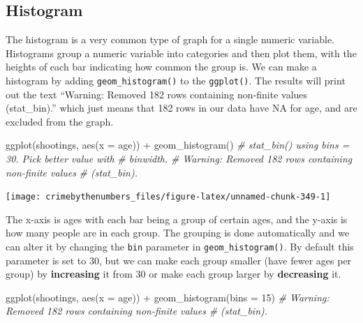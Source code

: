 \documentclass[
]{krantz}
\makeatletter
\newenvironment{Shaded}{\begin{snugshade}}{\end{snugshade}}
\newcommand{\AttributeTok}[1]{\textcolor[rgb]{0.61,0.61,0.61}{#1}}
\newcommand{\CommentTok}[1]{\textcolor[rgb]{0.37,0.37,0.37}{\textit{#1}}}
\newcommand{\DecValTok}[1]{\textcolor[rgb]{0.06,0.06,0.06}{#1}}
\newcommand{\FunctionTok}[1]{\textcolor[rgb]{0,0,0}{#1}}
\newcommand{\NormalTok}[1]{#1}
\newcommand{\SpecialCharTok}[1]{\textcolor[rgb]{0,0,0}{#1}}
\newenvironment{kframe}{%
\medskip{}
\setlength{\fboxsep}{.8em}
 \def\at@end@of@kframe{}%
 \ifinner\ifhmode%
  \def\at@end@of@kframe{\end{minipage}}%
  \begin{minipage}{\columnwidth}%
 \fi\fi%
 \def\FrameCommand##1{\hskip\@totalleftmargin \hskip-\fboxsep
 \colorbox{shadecolor}{##1}\hskip-\fboxsep
     \hskip-\linewidth \hskip-\@totalleftmargin \hskip\columnwidth}%
 \MakeFramed {\advance\hsize-\width
   \@totalleftmargin\z@ \linewidth\hsize
   \@setminipage}}%
 {\par\unskip\endMakeFramed%
 \at@end@of@kframe}
\renewenvironment{Shaded}{\begin{kframe}}{\end{kframe}}
\makeatother
\begin{document}
\hypertarget{histogram}{%
\subsection{Histogram}\label{histogram}}

The histogram is a very common type of graph for a single
numeric variable. Histograms group a numeric variable into
categories and then plot them, with the heights of each bar
indicating how common the group is. We can make a histogram
by adding \texttt{geom\_histogram()} to the
\texttt{ggplot()}. The results will print out the text
``Warning: Removed 182 rows containing non-finite values
(stat\_bin).'' which just means that 182 rows in our data
have NA for age, and are excluded from the graph.

\begin{Shaded}
\begin{Highlighting}[]
\FunctionTok{ggplot}\NormalTok{(shootings, }\FunctionTok{aes}\NormalTok{(}\AttributeTok{x =}\NormalTok{ age)) }\SpecialCharTok{+}
  \FunctionTok{geom\_histogram}\NormalTok{()}
\CommentTok{\# \textasciigrave{}stat\_bin()\textasciigrave{} using \textasciigrave{}bins = 30\textasciigrave{}. Pick better value with}
\CommentTok{\# \textasciigrave{}binwidth\textasciigrave{}.}
\CommentTok{\# Warning: Removed 182 rows containing non{-}finite values}
\CommentTok{\# (stat\_bin).}
\end{Highlighting}
\end{Shaded}

\begin{center}\texttt{[image: crimebythenumbers\_files/figure-latex/unnamed-chunk-349-1]} \end{center}

The x-axis is ages with each bar being a group of certain
ages, and the y-axis is how many people are in each group.
The grouping is done automatically and we can alter it by
changing the \texttt{bin} parameter in
\texttt{geom\_histogram()}. By default this parameter is set
to 30, but we can make each group smaller (have fewer ages
per group) by \textbf{increasing} it from 30 or make each
group larger by \textbf{decreasing} it.

\begin{Shaded}
\begin{Highlighting}[]
\FunctionTok{ggplot}\NormalTok{(shootings, }\FunctionTok{aes}\NormalTok{(}\AttributeTok{x =}\NormalTok{ age)) }\SpecialCharTok{+}
  \FunctionTok{geom\_histogram}\NormalTok{(}\AttributeTok{bins =} \DecValTok{15}\NormalTok{)}
\CommentTok{\# Warning: Removed 182 rows containing non{-}finite values}
\CommentTok{\# (stat\_bin).}
\end{Highlighting}
\end{Shaded}
\end{document}
